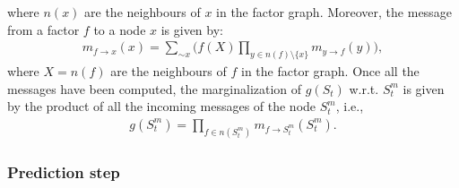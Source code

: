 \documentclass[twoside,11pt]{article}
\begin{document}
where $n(x)$ are the neighbours of $x$ in the factor graph. Moreover, the message from a factor $f$ to a node $x$ is given by:
\begin{align*}
m_{f \rightarrow x}(x) = \sum_{\sim x} \Bigg( f(X) \prod_{y \in n(f) \setminus \{x\}} m_{y \rightarrow f}(y)\Bigg),
\end{align*}
where $X = n(f)$ are the neighbours of $f$ in the factor graph. Once all the messages have been computed, the marginalization of $g(S_t)$ w.r.t. $S_t^m$ is given by the product of all the incoming messages of the node $S_t^m$, i.e.,
\begin{align*}
g(S_t^m) = \prod_{f \in n(S_t^m)} m_{f \rightarrow S_t^m}(S_t^m).
\end{align*}

\subsubsection{Prediction step} \label{ssec:p_step}
\end{document}
